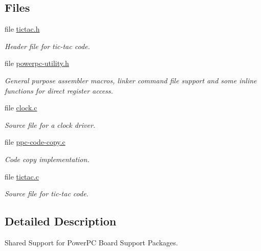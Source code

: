 \subsection*{Files}
\begin{DoxyCompactItemize}
\item 
file \mbox{\hyperlink{tictac_8h}{tictac.\+h}}
\begin{DoxyCompactList}\small\item\em Header file for tic-\/tac code. \end{DoxyCompactList}\item 
file \mbox{\hyperlink{powerpc-utility_8h}{powerpc-\/utility.\+h}}
\begin{DoxyCompactList}\small\item\em General purpose assembler macros, linker command file support and some inline functions for direct register access. \end{DoxyCompactList}\item 
file \mbox{\hyperlink{bsps_2powerpc_2shared_2clock_2clock_8c}{clock.\+c}}
\begin{DoxyCompactList}\small\item\em Source file for a clock driver. \end{DoxyCompactList}\item 
file \mbox{\hyperlink{ppc-code-copy_8c}{ppc-\/code-\/copy.\+c}}
\begin{DoxyCompactList}\small\item\em Code copy implementation. \end{DoxyCompactList}\item 
file \mbox{\hyperlink{tictac_8c}{tictac.\+c}}
\begin{DoxyCompactList}\small\item\em Source file for tic-\/tac code. \end{DoxyCompactList}\end{DoxyCompactItemize}


\subsection{Detailed Description}
Shared Support for Power\+PC Board Support Packages. 

